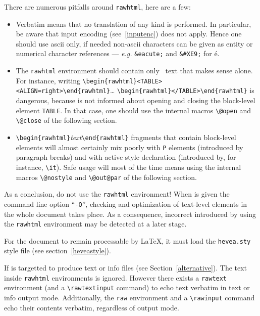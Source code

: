 There are numerous pitfalls around \texttt{rawhtml}, here are a few:
\begin{itemize}
\item
Verbatim means that no translation of any kind is performed. In
particular, be aware that input encoding (see~\ref{inputenc}) does
not apply. Hence one should use ascii only, if needed
non-ascii characters can be given as
entity or numerical character references --- \emph{e.g.}
\verb+&eacute;+ and \verb+&#XE9;+ for \'e.

\item
The \texttt{rawhtml}
environment should contain only \html~text that makes sense alone.
For instance, writing
\verb+\begin{rawhtml}<TABLE><ALIGN=right>\end{rawhtml}+\ldots{}
\verb+\begin{rawhtml}</TABLE>\end{rawhtml}+ is
dangerous, because \hevea{} is not informed about opening and closing
the block-level element \texttt{TABLE}. In that case, one should use
the internal macros \verb+\@open+ and \verb+\@close+ of the following
section.

\item \verb+\begin{rawhtml}+\textit{text}\verb+\end{rawhtml}+ fragments that
contain block-level elements will almost certainly mix poorly with
\verb+P+ elements (introduced by paragraph breaks) and with active
style declaration (introduced by, for instance, \verb+\it+).
Safe usage will most of the time means using the internal macros
\verb+\@nostyle+ and \verb+\@out@par+ of the following
section.
\end{itemize}


As a conclusion, do not use the \texttt{rawhtml} environment!
When \hevea{} is given the command line option ``\texttt{-O}'',
checking and optimization of text-level elements in the whole document
takes place.  As a consequence, incorrect \html{} introduced by using
the \texttt{rawhtml} environment may be detected at a later stage.

For the document to remain processable by \LaTeX{}, it must load the
\texttt{hevea.sty} style file (see section~\ref{heveastyle}).

If \hevea{} is targetted to produce text or info files (see
Section~\ref{alternative}).
The text inside \texttt{rawhtml} environments is ignored.
However there exists a \texttt{rawtext} environment (and a
\verb+\rawtextinput+ command) to echo text verbatim in text or info
output mode.
Additionally, the \texttt{raw} environment and a \verb+\rawinput+
command echo their contents verbatim, regardless of \hevea{} output
mode.

